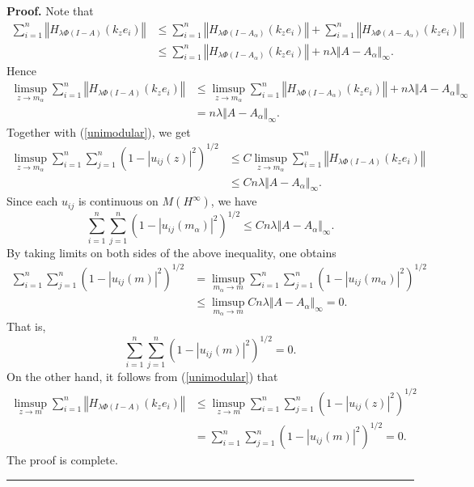 \documentclass{article}%
\newenvironment{proof}[1][Proof]{\noindent\textbf{#1.} }{\ \rule{0.5em}{0.5em}}
\begin{document}
\begin{proof}
Note that%
\begin{align*}
\sum_{i=1}^{n}\left\Vert H_{\lambda\Phi(I-A)}\left(  k_{z}e_{i}\right)
\right\Vert  & \leq\sum_{i=1}^{n}\left\Vert H_{\lambda\Phi(I-A_{\alpha}%
)}\left(  k_{z}e_{i}\right)  \right\Vert +\sum_{i=1}^{n}\left\Vert
H_{\lambda\Phi(A-A_{\alpha})}\left(  k_{z}e_{i}\right)  \right\Vert \\
& \leq\sum_{i=1}^{n}\left\Vert H_{\lambda\Phi(I-A_{\alpha})}\left(  k_{z}%
e_{i}\right)  \right\Vert +n\lambda\Vert A-A_{\alpha}\Vert_{\infty}.
\end{align*}
Hence
\begin{align*}
\limsup_{z\rightarrow m_{\alpha}}\sum_{i=1}^{n}\left\Vert H_{\lambda\Phi
(I-A)}\left(  k_{z}e_{i}\right)  \right\Vert  & \leq\limsup_{z\rightarrow
m_{\alpha}}\sum_{i=1}^{n}\left\Vert H_{\lambda\Phi(I-A_{\alpha})}\left(
k_{z}e_{i}\right)  \right\Vert +n\lambda\Vert A-A_{\alpha}\Vert_{\infty}\\
& =n\lambda\Vert A-A_{\alpha}\Vert_{\infty}.
\end{align*}
Together with (\ref{unimodular}), we get
\begin{align*}
\limsup_{z\rightarrow m_{\alpha}}\sum_{i=1}^{n}\sum_{j=1}^{n}\left(
1-\left\vert u_{ij}(z)\right\vert ^{2}\right)  ^{1/2}  & \leq C\limsup
_{z\rightarrow m_{\alpha}}\sum_{i=1}^{n}\left\Vert H_{\lambda\Phi(I-A)}\left(
k_{z}e_{i}\right)  \right\Vert \\
& \leq Cn\lambda\Vert A-A_{\alpha}\Vert_{\infty}.
\end{align*}
Since each $u_{ij}$ is continuous on $M\left(  H^{\infty}\right)  $, we have
\[
\sum_{i=1}^{n}\sum_{j=1}^{n}\left(  1-\left\vert u_{ij}(m_{\alpha})\right\vert
^{2}\right)  ^{1/2}\leq Cn\lambda\Vert A-A_{\alpha}\Vert_{\infty}.
\]
By taking limits on both sides of the above inequality, one obtains
\begin{align*}
\sum_{i=1}^{n}\sum_{j=1}^{n}\left(  1-\left\vert u_{ij}(m)\right\vert
^{2}\right)  ^{1/2}  & =\limsup_{m_{\alpha}\rightarrow m}\sum_{i=1}^{n}%
\sum_{j=1}^{n}\left(  1-\left\vert u_{ij}(m_{\alpha})\right\vert ^{2}\right)
^{1/2}\\
& \leq\limsup_{m_{\alpha}\rightarrow m}Cn\lambda\Vert A-A_{\alpha}%
\Vert_{\infty}=0.
\end{align*}
That is,
\[
\sum_{i=1}^{n}\sum_{j=1}^{n}\left(  1-\left\vert u_{ij}(m)\right\vert
^{2}\right)  ^{1/2}=0.
\]
On the other hand, it follows from (\ref{unimodular}) that
\begin{align*}
\limsup_{z\rightarrow m}\sum_{i=1}^{n}\left\Vert H_{\lambda\Phi(I-A)}\left(
k_{z}e_{i}\right)  \right\Vert  & \leq\limsup_{z\rightarrow m}\sum_{i=1}%
^{n}\sum_{j=1}^{n}\left(  1-\left\vert u_{ij}(z)\right\vert ^{2}\right)
^{1/2}\\
& =\sum_{i=1}^{n}\sum_{j=1}^{n}\left(  1-\left\vert u_{ij}(m)\right\vert
^{2}\right)  ^{1/2}=0.
\end{align*}
The proof is complete.
\end{proof}
\end{document}
